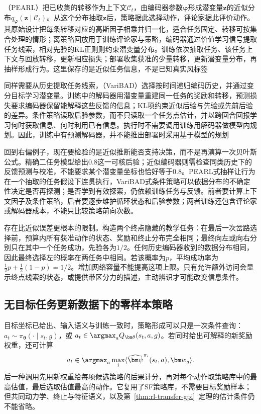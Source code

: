 （PEARL）把已收集的转移作为上下文$\mathcal C_t$，由编码器参数$\bm\varphi$形成潜变量$\bm z$的近似分布$q_{\bm\varphi}(\bm z\mid\mathcal C_t)$。从这个分布抽取$\bm z$后，策略据此选择动作，评论家据此评价动作。其原始设计把每条转移对应的高斯因子相乘并归一化，适合任务固定、转移可按集合处理的情形；离策略回放用于训练评论家与策略，编码器通过价值学习信号提取任务线索，相对先验的KL正则则约束潜变量分布。训练依次抽取任务、该任务上下文与回放转移，更新相应损失；部署收集获准的少量转移，更新潜变量分布，再抽样形成行为。这里保存的是近似任务信息，不是已知真实风标签

同样需要从历史提取任务线索，（VariBAD）选择按时间递归编码历史，并通过变分目标学习潜变量。训练中的解码器用潜变量重建同一任务的奖励和转移，预测损失要求编码器保留能解释这些反馈的信息；KL项约束近似后验与先验或先前后验的差异。条件策略读取后验参数，而不只读取一个任务点估计，并以跨回合回报学习何时获取信息、何时利用已有信息。执行时不需要调用训练用解码器做模型内规划。因此，训练中有预测解码器，并不能推出部署时采用基于模型的规划

回到右偏例子，现在要检验的是近似推断能否支持决策，而不是再演算一次贝叶斯公式。精确二任务模型给出$0.8$这一可核后验；近似编码器则需检查同类历史下的反馈预测与校准，不能要求某个潜变量坐标也恰好等于$0.8$。PEARL式抽样让行为在一个抽取的任务假设下连贯执行，VariBAD式条件策略可以依据分布的不确定性决定是否再探测；是否学到有效探索，仍依赖训练任务与反馈。前者要计算上下文因子及条件策略，后者要逐步维护循环状态和后验参数；两者训练还包含评论家或解码器成本，不能只比较策略前向次数。

存在比近似误差更根本的限制。构造两个终点隐藏的教学任务：在最后一次岔路选择前，预算内所有获准动作的状态、奖励和终止分布完全相同；最终向左或向右分别只在其中一个任务成功，先验各为$1/2$。任何历史编码器收到的数据分布相同，因此最终选择左的概率在两任务中相同。若该概率为$p$，平均成功率为$\tfrac12p+\tfrac12(1-p)=1/2$。增加网络容量不能提高这项上限。只有允许额外访问会显示终点线索的状态，或提供带区分力的描述，主动辨识才可能改变信息条件。

\subsection{无目标任务更新数据下的零样本策略}
\label{sec:rl-transfer-zero-shot}

目标坐标已给出、输入语义与训练一致时，策略形成可以只是一次条件查询：
$a_t\sim\pi_{\bm\theta}(\cdot\mid s_t,g)$，或
$a_t\in\argmax_a Q_{\bm\theta}(s_t,a,g)$。若同时给出可解释的新奖励权重，还可计算
\[
 a_t\in\argmax_a\max_i
 \langle\widehat{\bm\psi}^{\pi_i}(s_t,a),\bm w_g\rangle.
\]
后一种调用先用新权重给每项候选策略的后果计分，再对每个动作取策略库中的最高估值，最后选取估值最高的动作。它复用了SF策略库，不需要目标奖励样本；但共同动力学、终止与特征语义，以及第~\ref{thm:rl-transfer-gpi}~定理的估计条件仍不能省略。


